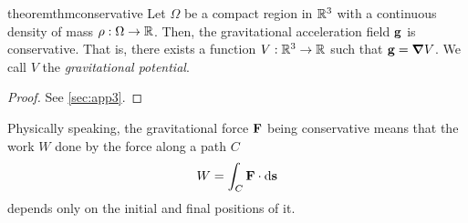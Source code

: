 \documentclass[../main.tex]{subfiles}
\begin{document}
\begin{restatable}{theorem}{thmconservative}\label{thm:conservative}
  Let $\Omega$ be a compact region in $\mathbb{R}^3$ with a continuous density of mass $\rho:\Omega\to\mathbb{R}$. Then, the gravitational acceleration field $\boldsymbol{\mathrm{g}}$ is conservative. That is, there exists a function $V:\mathbb{R}^3\rightarrow\mathbb{R}$ such that $\boldsymbol{\mathrm{g}}=\grad V$. We call $V$ the \emph{gravitational potential}.
\end{restatable}
\begin{proof}
  See \cref{sec:app3}.
\end{proof}
Physically speaking, the gravitational force $\boldsymbol{\mathrm{F}}$ being conservative means that the work $W$ done by the force along a path $C$
\begin{equation}
  W=\int_C\boldsymbol{\mathrm{F}}\cdot\dd{\boldsymbol{\mathrm{s}}}
\end{equation}
depends only on the initial and final positions of it.
\end{document}
